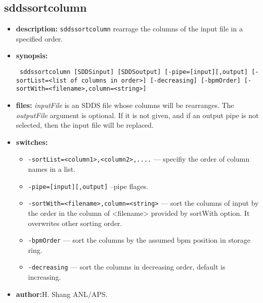 \newpage
\subsection{sddssortcolumn}
\label{sddssortcolumn}

\begin{itemize}
\item {\bf description:} \verb|sddssortcolumn| rearrage the columns of the input file in a specified order. 

\item {\bf synopsis:} 
%
%
\begin{flushleft}{\tt
sddssortcolumn [SDDSinput] [SDDSoutput] [-pipe=[input][,output]
  [-sortList=<list of columns in order>] [-decreasing] 
  [-bpmOrder] [-sortWith=<filename>,column=<string>]
}\end{flushleft} 

\item {\bf files:}
{\em inputFile} is an SDDS file whose columns will be rearranges.  The {\em outputFile} argument is
optional.  If it is not given, and if an output pipe is not selected, then the input file will be
replaced.
\item {\bf switches:}
    \begin{itemize}
    \item {\tt -sortList=<column1>,<column2>,....} ---
          specifiy the order of column names in a list. 
    \item {\tt -pipe=[input][,output]} --pipe flages.
    \item {\tt -sortWith=<filename>,column=<string>} --- sort the columns of input by the order in the column of <filename> provided by sortWith option. It overwrites other sorting order. 
    \item {\tt -bpmOrder} --- sort the columns by the assumed bpm position in storage ring.
    \item {\tt -decreasing} --- sort the columns in decreasing order, default is increasing.
    \end{itemize}
\item {\bf author:}H. Shang ANL/APS.
\end{itemize}


